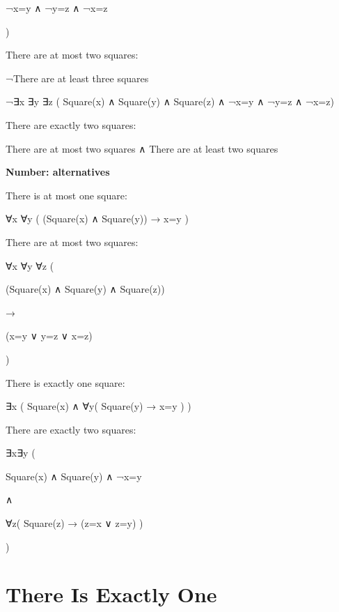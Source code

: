 \documentclass[12pt]{extarticle}
\begin{document}
\begin{multicols*}{3}
\hspace{10mm} ¬x=y ∧ ¬y=z ∧ ¬x=z
 
\hspace{5mm} )
 
There are at most two squares:
 
\hspace{5mm} ¬There are at least three squares
 
\hspace{5mm} ¬∃x ∃y ∃z ( Square(x) ∧ Square(y) ∧ Square(z) ∧ ¬x=y ∧ ¬y=z ∧ ¬x=z)
 
There are exactly two squares:
 
\hspace{5mm} There are at most two squares ∧ There are at least two squares
 
\textbf{Number: alternatives}
 
There is at most one square:
 
\hspace{5mm} ∀x ∀y ( (Square(x) ∧ Square(y)) → x=y )
 
There are at most two squares:
 
\hspace{5mm} ∀x ∀y ∀z (
 
\hspace{10mm} (Square(x) ∧ Square(y) ∧ Square(z))
 
\hspace{10mm} →
 
\hspace{10mm} (x=y ∨ y=z ∨ x=z)
 
\hspace{5mm} )
 
There is exactly one square:
 
\hspace{5mm} ∃x ( Square(x) ∧ ∀y( Square(y) → x=y ) )
 
There are exactly two squares:
 
\hspace{5mm} ∃x∃y (
 
\hspace{10mm} Square(x) ∧ Square(y) ∧ ¬x=y
 
\hspace{10mm} ∧
 
\hspace{10mm} ∀z( Square(z) → (z=x ∨ z=y) )
 
\hspace{5mm} )
 
 
 
\section{There Is Exactly One}
 

\end{multicols*}
\end{document}
